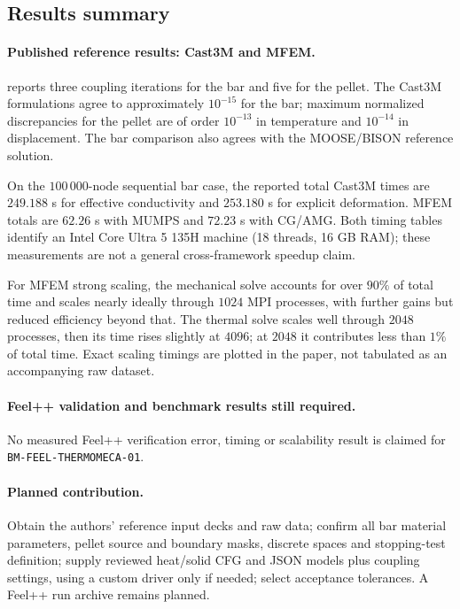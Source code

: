 \subsection{Results summary}
\paragraph{Published reference results: Cast3M and MFEM.}
 reports three coupling iterations for the bar and
five for the pellet. The Cast3M formulations agree to approximately $10^{-15}$
for the bar; maximum normalized discrepancies for the pellet are of order
$10^{-13}$ in temperature and $10^{-14}$ in displacement. The bar comparison
also agrees with the MOOSE/BISON reference solution.

On the $100\,000$-node sequential bar case, the reported total Cast3M times are
$249.188$ s for effective conductivity and $253.180$ s for explicit deformation.
MFEM totals are $62.26$ s with MUMPS and $72.23$ s with CG/AMG. Both timing
tables identify an Intel Core Ultra 5 135H machine (18 threads, 16 GB RAM);
these measurements are not a general cross-framework speedup claim.

For MFEM strong scaling, the mechanical solve accounts for over $90\%$ of total
time and scales nearly ideally through $1024$ MPI processes, with further gains
but reduced efficiency beyond that. The thermal solve scales well through
$2048$ processes, then its time rises slightly at $4096$; at $2048$ it contributes
less than $1\%$ of total time. Exact scaling timings are plotted in the paper,
not tabulated as an accompanying raw dataset.

\paragraph{Feel++ validation and benchmark results still required.}
No measured Feel++ verification error, timing or scalability result is claimed
for \nolinkurl{BM-FEEL-THERMOMECA-01}.
\paragraph{Planned contribution.} Obtain the authors' reference
input decks and raw data; confirm all bar material parameters, pellet source
and boundary masks, discrete spaces and stopping-test definition; supply reviewed heat/solid CFG and JSON models plus coupling settings, using a custom driver only if needed; select acceptance tolerances. A Feel++ run archive remains planned.


